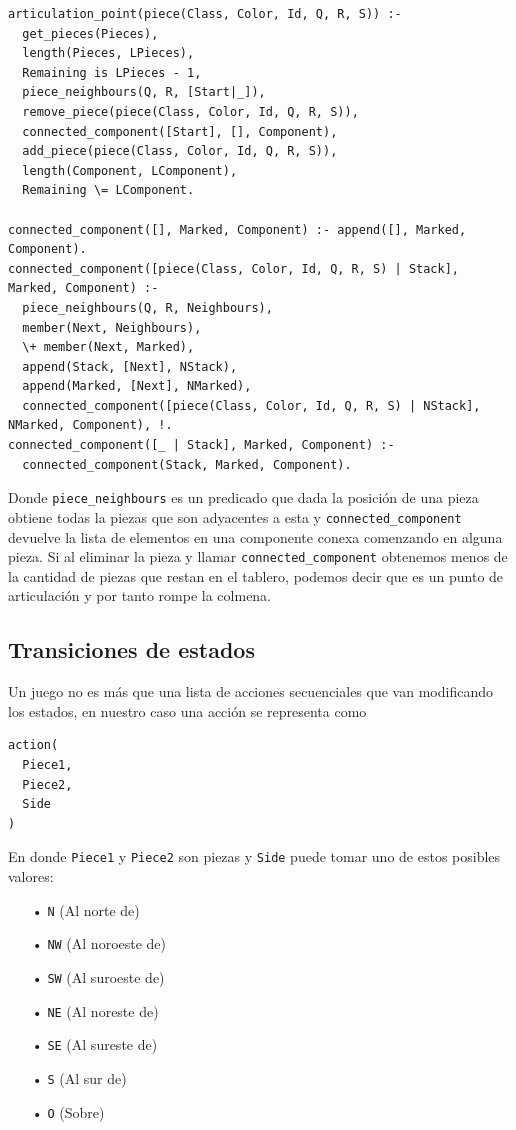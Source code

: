 \documentclass[a4paper,11pt]{article}
\begin{document}
\begin{lstlisting}
articulation_point(piece(Class, Color, Id, Q, R, S)) :-
  get_pieces(Pieces),
  length(Pieces, LPieces),
  Remaining is LPieces - 1,
  piece_neighbours(Q, R, [Start|_]),
  remove_piece(piece(Class, Color, Id, Q, R, S)),
  connected_component([Start], [], Component),
  add_piece(piece(Class, Color, Id, Q, R, S)),
  length(Component, LComponent),
  Remaining \= LComponent.
 
connected_component([], Marked, Component) :- append([], Marked, Component).
connected_component([piece(Class, Color, Id, Q, R, S) | Stack], Marked, Component) :-
  piece_neighbours(Q, R, Neighbours),
  member(Next, Neighbours),
  \+ member(Next, Marked),
  append(Stack, [Next], NStack),
  append(Marked, [Next], NMarked),
  connected_component([piece(Class, Color, Id, Q, R, S) | NStack], NMarked, Component), !.
connected_component([_ | Stack], Marked, Component) :-
  connected_component(Stack, Marked, Component).
\end{lstlisting}

Donde \verb+piece_neighbours+ es un predicado que dada la posición de una pieza obtiene todas la piezas que son adyacentes a esta y \verb+connected_component+ devuelve la lista de elementos en una componente conexa comenzando en alguna pieza. Si al eliminar la pieza y llamar \verb+connected_component+ obtenemos menos de la cantidad de piezas que restan en el tablero, podemos decir que es un punto de articulaci\'on y por tanto rompe la colmena.

\subsection{Transiciones de estados}

Un juego no es más que una lista de acciones secuenciales que van modificando los estados, en nuestro caso una acci\'on se representa como

\begin{lstlisting}
action(
  Piece1,
  Piece2,
  Side
)
\end{lstlisting}

En donde \verb+Piece1+ y \verb+Piece2+ son piezas y \verb+Side+ puede tomar uno de estos posibles valores:

\begin{itemize}
\item[•] \verb+N+ (Al norte de)

\item[•] \verb+NW+ (Al noroeste de)

\item[•] \verb+SW+ (Al suroeste de)

\item[•] \verb+NE+ (Al noreste de)

\item[•] \verb+SE+ (Al sureste de)

\item[•] \verb+S+ (Al sur de)

\item[•] \verb+O+ (Sobre)
\end{itemize}
\end{document}
